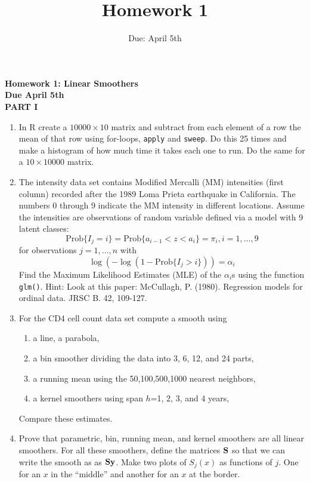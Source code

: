 \documentclass[12pt]{article}
\title{Homework 1}
\date{Due: April 5th}
\begin{document}
\begin{center}
{\bf Homework 1: Linear Smoothers\\
Due April 5th\\ PART I}\end{center}

\begin{enumerate}
\item In R create a $10000 \times 10$ matrix and subtract from
  each element of a row the mean of that row using for-loops, {\tt apply}
  and {\tt sweep}. Do this 25 times and make a histogram of how much
  time it takes each one to run. 
  Do the same for a $10 \times 10000$ matrix.
  

\item The intensity data set contains Modified
  Mercalli (MM) intensities (first column)
  recorded after the 1989 Loma Prieta earthquake in California. The
  numbers 0 through 9 indicate the MM intensity in different
  locations. Assume the intensities are observations of random
  variable defined via a model with 9 latent classes:
\[
\mbox{Prob}\{I_j = i\} = \mbox{Prob}\{a_{i-1} < z < a_i \} = \pi_i,
i=1,\dots,9
\]
for observations $j=1,\dots,n$ with 
\[
\log(-\log(1-\mbox{Prob}\{ I_j > i  \})) = \alpha_i 
\]
Find the Maximum Likelihood Estimates (MLE) of the $\alpha_i$s using
the function {\tt glm()}. Hint: Look at 
this paper: McCullagh, P. (1980). Regression models for ordinal
data. JRSC B. 42, 109-127.

\item For the CD4 cell count data set compute a smooth using
  \begin{enumerate}  
  \item a line, a parabola,
  \item a bin smoother dividing the data into 3, 6, 12, and 24 parts,
  \item  a running mean using the 50,100,500,1000 nearest
    neighbors, 
  \item a kernel 
    smoothers  using span $h$=1, 2, 3, and 4 years,
  \end{enumerate}
  
  Compare these estimates. 
  
\item Prove that parametric, bin, running mean, and kernel smoothers
  are all linear smoothers. For all these smoothers, define the
  matrices ${\mathbf S}$ so that we can write the smooth as
  as ${\mathbf S} {\mathbf y}$. Make
  two plots of $S_{j}(x)$ as  functions of $j$. One for an $x$ in the
  ``middle'' and another for an $x$ at the border.
  

\end{enumerate}
\end{document}
